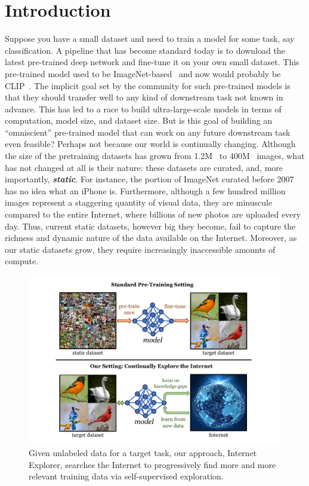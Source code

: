 \chapter{Introduction}

Suppose you have a small dataset and need to train a model for some task, say classification.
A pipeline that has become standard today is to download the latest pre-trained deep network and fine-tune it on your own small dataset. This pre-trained model used to be ImageNet-based~\cite{deng2009imagenet,he2016deep} and now would probably be CLIP~\cite{radford2021learning}. The implicit goal set by the community for such pre-trained models is that they should transfer well to any kind of downstream task not known in advance. This has led to a race to build ultra-large-scale models in terms of computation, model size, and dataset size. But is this goal of building an ``omniscient'' pre-trained model that can work on any future downstream task even feasible? Perhaps not because our world is continually changing.
Although the size of the pretraining datasets has grown from 1.2M~\cite{deng2009imagenet} to 400M~\cite{schuhmann2021laion} images, what has not changed at all is their nature: these datasets are curated, and, more importantly, \textit{\textbf{static}}. For instance, the portion of ImageNet curated before 2007 has no idea what an iPhone is.
Furthermore, although a few hundred million images represent a staggering quantity of visual data, they are minuscule compared to the entire Internet, where billions of new photos are uploaded every day.
Thus, current static datasets, however big they become, fail to capture the richness and dynamic nature of the data available on the Internet.
Moreover, as our static datasets grow, they require increasingly inaccessible amounts of compute.

\begin{figure}[t]
    \centering
    \includegraphics[width=0.8\linewidth]{figures/teaser2.pdf}
    \caption{Given unlabeled data for a target task, our approach, Internet Explorer, searches the Internet to progressively find more and more relevant training data via self-supervised exploration.}
    \label{fig:teaser}
\end{figure}

